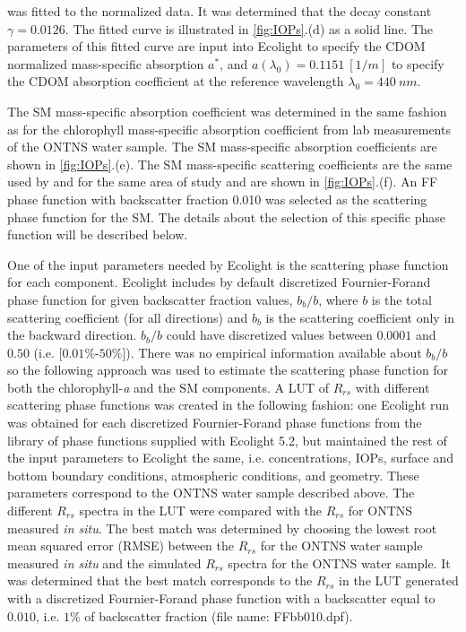 \documentclass[onecolumn,3p,letterpaper]{elsarticle}
\begin{document}
\noindent was fitted to the normalized data. It was determined that the decay constant $\gamma=0.0126$. The fitted curve is illustrated in \autoref{fig:IOPs}.(d) as a solid line. The parameters of this fitted curve are input into Ecolight to specify the CDOM normalized mass-specific absorption $a^*$, and $a(\lambda_0)=0.1151~[1/m]$ to specify the CDOM absorption coefficient at the reference wavelength $\lambda_0=440~nm$.

The SM mass-specific absorption coefficient was determined in the same fashion as for the chlorophyll mass-specific absorption coefficient from lab measurements of the ONTNS water sample. The SM mass-specific absorption coefficients are shown in \autoref{fig:IOPs}.(e). The SM mass-specific scattering coefficients are the same used by \citet{Raqueno:2000} and \citet{Raqueno:2003} for the same area of study and are shown in \autoref{fig:IOPs}.(f). An FF phase function with backscatter fraction 0.010 was selected as the scattering phase function for the SM. The details about the selection of this specific phase function will be described below.

One of the input parameters needed by Ecolight is the scattering phase function for each component. Ecolight includes by default discretized Fournier-Forand phase function for given backscatter fraction values, $b_b/b$, where $b$ is the total scattering coefficient (for all directions) and $b_b$ is the scattering coefficient only in the backward direction. $b_b/b$ could have discretized values between $0.0001$ and $0.50$ (i.e. [$0.01\%$-$50\%$]). There was no empirical information available about $b_b/b$ so the following approach was used to estimate the scattering phase function for both the chlorophyll-{\it a} and the SM components. A LUT of $R_{rs}$ with different scattering phase functions was created in the following fashion: one Ecolight run was obtained for each discretized Fournier-Forand phase functions from the library of phase functions supplied with Ecolight 5.2, but maintained the rest of the input parameters to Ecolight the same, i.e. concentrations, IOPs, surface and bottom boundary conditions, atmospheric conditions, and geometry. These parameters correspond to the ONTNS water sample described above. The different $R_{rs}$ spectra in the LUT were compared with the $R_{rs}$ for ONTNS measured {\it in situ}. The best match was determined by choosing the lowest root mean squared error (RMSE) between the $R_{rs}$ for the ONTNS water sample measured {\it in situ} and the simulated $R_{rs}$ spectra for the ONTNS water sample. It was determined that the best match corresponds to the $R_{rs}$ in the LUT generated with a discretized Fournier-Forand phase function with a backscatter equal to $0.010$, i.e. $1\%$ of backscatter fraction (file name: FFbb010.dpf). 
\end{document}

